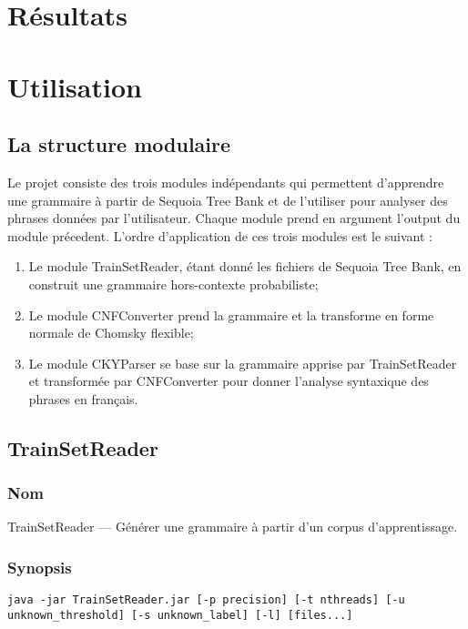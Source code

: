 \documentclass[12pt]{article}
\begin{document}
\section{R\'esultats}

\section{Utilisation}
\subsection{La structure modulaire}
Le projet consiste des trois modules ind\'ependants qui permettent d'apprendre une
grammaire \`a partir de Sequoia Tree Bank \cite{Sequoia} et de l'utiliser pour
analyser des phrases donn\'ees par l'utilisateur. Chaque module prend en
argument l'output du module pr\'ecedent. L'ordre d'application de ces trois
modules est le suivant :
\begin{enumerate}
  \item Le module TrainSetReader, \'etant donn\'e les fichiers de Sequoia Tree Bank,
  en construit une grammaire hors-contexte probabiliste;
  \item Le module CNFConverter prend la grammaire et la transforme en forme
  normale de Chomsky flexible;
  \item Le module CKYParser se base sur la grammaire apprise par TrainSetReader
  et transform\'ee par CNFConverter pour donner l'analyse syntaxique des phrases
  en français.
\end{enumerate}

\subsection{TrainSetReader}
\subsubsection{Nom}
 
TrainSetReader --- G\'en\'erer une grammaire \`a partir d'un corpus d'apprentissage.
 
\subsubsection{Synopsis}
 
{\ttfamily
\begin{verbatim}
java -jar TrainSetReader.jar [-p precision] [-t nthreads] [-u
unknown_threshold] [-s unknown_label] [-l] [files...]
\end{verbatim}
}
 
\end{document}
